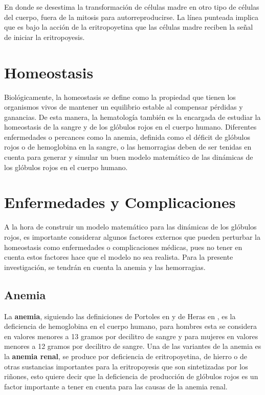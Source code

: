 En donde se desestima la transformación de células madre en otro tipo de células del cuerpo, fuera de la mitosis para autorreproducirse. La línea punteada implica que es bajo la acción de la eritropoyetina que las células madre reciben la señal de iniciar la eritropoyesis.

\section{Homeostasis}\label{sec:RBC:homeostasis}

Biológicamente, la homeostasis se define como la propiedad que tienen los organismos vivos de mantener un equilibrio estable al compensar pérdidas y ganancias. De esta manera, la hematología también es la encargada de estudiar la homeostasis de la sangre y de los glóbulos rojos en el cuerpo humano. Diferentes enfermedades o percances como la anemia, definida como el déficit de glóbulos rojos o de hemoglobina en la sangre, o las hemorragias deben de ser tenidas en cuenta para generar y simular un buen modelo matemático de las dinámicas de los glóbulos rojos en el cuerpo humano.

\section{Enfermedades y Complicaciones}\label{sec:RBC:enfermedades}

A la hora de construir un modelo matemático para las dinámicas de los glóbulos rojos, es importante considerar algunos factores externos que pueden perturbar la homeostasis como enfermedades o complicaciones médicas, pues no tener en cuenta estos factores hace que el modelo no sea realista. Para la presente investigación, se tendrán en cuenta la anemia y las hemorragias.

\subsection{Anemia}\label{subsec:RBC:enfermedades:anemia}
La \textbf{anemia}, siguiendo las definiciones de Portoles en \cite{portoles2021anemia} y de Heras en \cite{heras2023anemia}, es la deficiencia de hemoglobina en el cuerpo humano, para hombres esta se considera en valores menores a 13 gramos por decilitro de sangre y para mujeres en valores menores a 12 gramos por decilitro de sangre. Una de las variantes de la anemia es la \textbf{anemia renal}, se produce por deficiencia de eritropoyetina, de hierro o de otras sustancias importantes para la eritropoyesis que son sintetizadas por los riñones, esto quiere decir que la deficiencia de producción de glóbulos rojos es un factor importante a tener en cuenta para las causas de la anemia renal.

